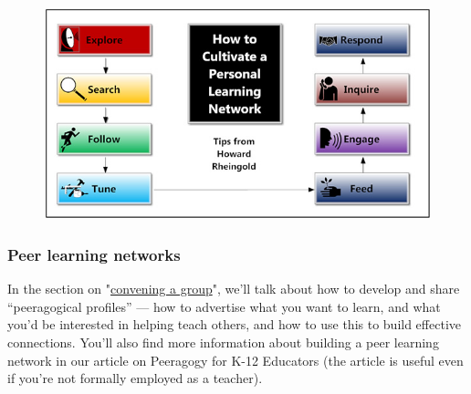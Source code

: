 \begin{figure}[htbp]
\centering
\includegraphics{../pictures/cultivate.jpg}
\end{figure}

\subsubsection{Peer learning networks}

In the section on "\href{http://peeragogy.org/convene/}{convening a
group}", we'll talk about how to develop and share ``peeragogical
profiles'' --- how to advertise what you want to learn, and what you'd
be interested in helping teach others, and how to use this to build
effective connections. You'll also find more information about building
a peer learning network in our article on Peeragogy for K-12 Educators
(the article is useful even if you're not formally employed as a
teacher).
